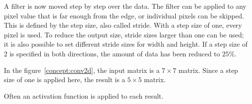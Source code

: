 { 
 A filter is now moved step by step over the data.  The filter can be applied to any pixel value that is far enough from the edge, or individual pixels can be skipped. This is defined by the step size, also called stride. With a step size of one, every pixel is used. To reduce the output size, stride sizes larger than one can be used; it is also possible to set different stride sizes for width and height. If a step size of $2$ is specified in both directions, the amount of data has been reduced to $25\%$. \cite{Dumoulin:2016}
 
 In the figure~\ref{concept:conv2d}, the input matrix is a $7\times 7$ matrix. Since a step size of one is applied here, the result is a $5\times 5$ matrix.
 
 Often an activation function is applied to each result.
     
    \begin{figure}[htb]
        
       
        \centering
\end{figure}}
